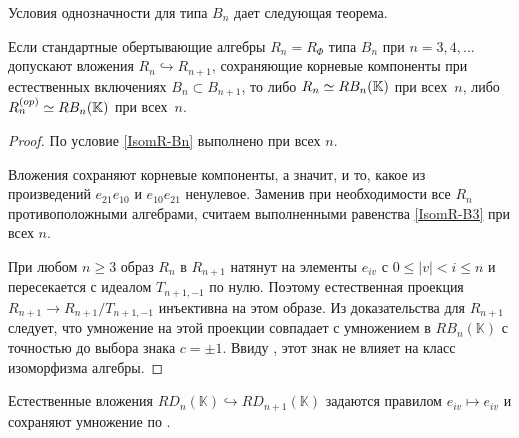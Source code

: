 \documentclass[a4paper,14pt,oneside,openany]{memoir}
\begin{document}
Условия однозначности для типа $B_n$ дает следующая теорема.

\begin{theorem}\label{th:Stand-Bn}
    Если стандартные обертывающие алгебры $R_n=R_\Phi$ типа $B_n$ при
    $n=3,4,\ldots$ допускают вложения $R_n\hookrightarrow R_{n+1}$, сохраняющие
    корневые компоненты при естественных включениях $B_n\subset B_{n+1}$, то либо
    $R_n\simeq\nobreak RB_n(\mathbb{K})$ при всех~$n$, либо
    $R_n^{(op)}\simeq\nobreak RB_n(\mathbb{K})$ при всех~$n$.
\end{theorem}

\begin{proof}
    По  условие \eqref{IsomR-Bn} выполнено при
    всех $n$.

    Вложения сохраняют корневые компоненты, а значит, и то, какое из произведений
    $e_{21}e_{10}$ и $e_{10}e_{21}$ ненулевое. Заменив при необходимости все $R_n$
    противоположными алгебрами, считаем выполненными равенства \eqref{IsomR-B3} при
    всех $n$.

    При любом $n\geq 3$ образ $R_n$ в $R_{n+1}$ натянут на элементы $e_{iv}$ с
    $0\leq |v|<i\leq n$ и пересекается с идеалом $T_{n+1,-1}$ по нулю. Поэтому
    естественная проекция $R_{n+1}\to R_{n+1}/T_{n+1,-1}$ инъективна на этом
    образе. Из доказательства  для $R_{n+1}$ следует, что
    умножение на этой проекции совпадает с умножением в $RB_n(\mathbb{K})$ с
    точностью до выбора знака $c=\pm 1$. Ввиду , этот знак
    не влияет на класс изоморфизма алгебры.
\end{proof}

Естественные вложения $RD_n(\mathbb{K})\hookrightarrow RD_{n+1}(\mathbb{K})$
задаются правилом $e_{iv}\mapsto e_{iv}$ и сохраняют умножение по
.
\end{document}
